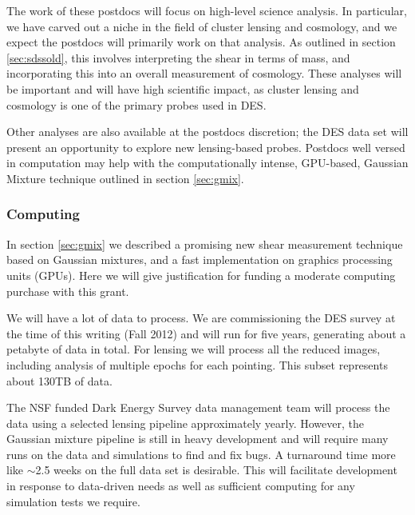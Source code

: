 \documentclass[12pt]{article}
\newcommand{\commissdate}{Fall 2012}
\begin{document}
The work of these postdocs will focus on high-level science analysis.  In
particular, we have carved out a niche in the field of cluster lensing and
cosmology, and we expect the postdocs will primarily work on that analysis.  As
outlined in section \ref{sec:sdssold}, this involves interpreting the shear in
terms of mass, and incorporating this into an overall measurement of cosmology.
These analyses will be important and will have high scientific impact, as
cluster lensing and cosmology is one of the primary probes used in DES.

Other analyses are also available at the postdocs discretion; the DES data set
will present an opportunity to explore new lensing-based probes.  Postdocs well
versed in computation may help with the computationally intense, GPU-based,
Gaussian Mixture technique outlined in section \ref{sec:gmix}.

\subsubsection{Computing} \label{sec:computing}

In section \ref{sec:gmix} we described a promising new shear measurement
technique based on Gaussian mixtures, and a fast implementation on graphics
processing units (GPUs).  Here we will give justification for funding a
moderate computing purchase with this grant.

We will have a lot of data to process.  We are commissioning the DES survey at
the time of this writing (\commissdate) and will run for five years, generating
about a petabyte of data in total.  For lensing we will process all the reduced
images, including analysis of multiple epochs for each pointing.  This subset
represents about 130TB of data.

The NSF funded Dark Energy Survey data management team will process the data
using a selected lensing pipeline approximately yearly.  However, the Gaussian
mixture pipeline is still in heavy development and will require many runs on
the data and simulations to find and fix bugs.  A turnaround time more like
$\sim$2.5 weeks on the full data set is desirable.   This will facilitate
development in response to data-driven needs as well as sufficient computing
for any simulation tests we require.

\end{document}

